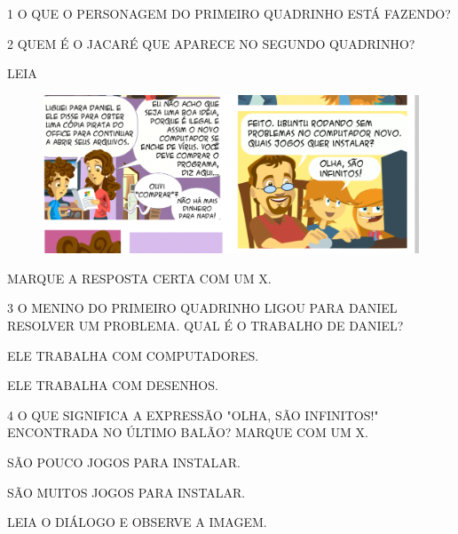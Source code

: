 \num{1} O QUE O PERSONAGEM DO PRIMEIRO QUADRINHO ESTÁ FAZENDO?


\num{2} QUEM É O JACARÉ QUE APARECE NO SEGUNDO QUADRINHO?


\pagebreak
LEIA

\begin{figure}[htpb!]
\includegraphics[width=\textwidth]{media/image172.png}
\end{figure}

MARQUE A RESPOSTA CERTA COM UM X.

\num{3} O MENINO DO PRIMEIRO QUADRINHO LIGOU PARA DANIEL RESOLVER UM PROBLEMA. QUAL É O TRABALHO DE DANIEL?

\begin{boxlist}
 ELE TRABALHA COM COMPUTADORES.

 ELE TRABALHA COM DESENHOS.
\end{boxlist}

\num{4} O QUE SIGNIFICA A EXPRESSÃO "OLHA, SÃO INFINITOS!" ENCONTRADA NO ÚLTIMO BALÃO? MARQUE COM UM X.

\begin{boxlist}
 SÃO POUCO JOGOS PARA INSTALAR.

 SÃO MUITOS JOGOS PARA INSTALAR.
\end{boxlist}

\pagebreak
LEIA O DIÁLOGO E OBSERVE A IMAGEM.




